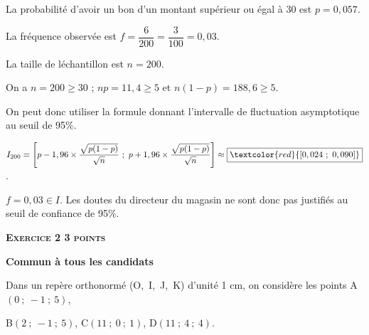 \documentclass[12pt]{article}
\newcommand{\euro}{\eurologo{}}
\begin{document}
\begin{enumerate}
%

La probabilité d'avoir un bon d'un montant supérieur ou égal à 30 \euro est $p=0,057$.

\noindent La fréquence observée est $f=\dfrac{6}{200}=\dfrac{3}{100}=0,03$.

\noindent La taille de léchantillon est $n=200$.

\noindent On a $n=200\geqslant 30$ ; $np=11,4\geqslant 5$ et $n(1-p)=188,6\geqslant 5$.

\noindent On peut donc utiliser la formule donnant l'intervalle de fluctuation asymptotique au seuil de 95\:\%.

$I_{200}=\left[p-1,96\times \dfrac{\sqrt{p(1-p)}}{\sqrt{n}}~;~p+1,96\times \dfrac{\sqrt{p(1-p)}}{\sqrt{n}}\right]\approx \boxed{\textcolor{red}{[0,024~;~0,090]}}$.

\noindent $f=0,03\in I$. Les doutes du directeur du magasin ne sont donc pas justifiés au seuil de confiance de 95\:\%.
\end{enumerate}

\vspace{0,5cm}

\textbf{\textsc{Exercice 2 \hfill 3 points}}

\textbf{Commun à tous les candidats} 

\medskip

Dans un repère orthonormé (O,~I,~J,~K) d'unité 1 cm, on considère les points A$(0~;~-1~;~5)$,

B$(2~;~-1~;~5)$, C$(11~;~0~;~1)$, D$(11~;~4~;~4)$.

%
%
%
%
%
%
%
%
\end{document}
